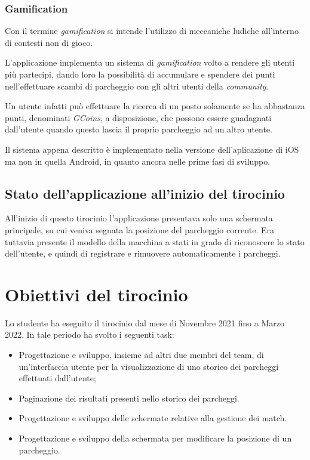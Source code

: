 \hypertarget{gamification}{%
\subsubsection{Gamification}\label{gamification}}

Con il termine \emph{gamification} si intende l'utilizzo di meccaniche ludiche all'interno di contesti non di gioco.

L'applicazione implementa un sistema di \emph{gamification} volto a rendere gli utenti più partecipi, dando loro la possibilità di accumulare e spendere dei punti nell'effettuare scambi di parcheggio con gli altri utenti della \emph{community}.

Un utente infatti può effettuare la ricerca di un posto solamente se ha abbastanza punti, denominati \emph{GCoins}, a disposizione, che possono essere guadagnati dall'utente quando questo lascia il proprio parcheggio ad un altro utente.

Il sistema appena descritto è implementato nella versione dell'aplicazione di iOS ma non in quella Android, in quanto ancora nelle prime fasi di sviluppo.

\hypertarget{stato-dellapplicazione-allinizio-del-tirocinio}{%
\subsection{Stato dell'applicazione all'inizio del tirocinio}\label{stato-dellapplicazione-allinizio-del-tirocinio}}

All'inizio di questo tirocinio l'applicazione presentava solo una schermata principale, su cui veniva segnata la posizione del parcheggio corrente. Era tuttavia presente il modello della macchina a stati in grado di riconoscere lo stato dell'utente, e quindi di registrare e rimuovere automaticamente i parcheggi.

\hypertarget{obiettivi-del-tirocinio}{%
\section{Obiettivi del tirocinio}\label{obiettivi-del-tirocinio}}

Lo studente ha eseguito il tirocinio dal mese di Novembre 2021 fino a Marzo 2022. In tale periodo ha svolto i seguenti task:

\begin{itemize}

\item Progettazione e sviluppo, insieme ad altri due membri del team, di un'interfaccia utente per la visualizzazione di uno storico dei parcheggi effettuati dall'utente;
\item Paginazione dei risultati presenti nello storico dei parcheggi.
\item Progettazione e sviluppo delle schermate relative alla gestione dei match.
\item Progettazione e sviluppo della schermata per modificare la posizione di un parcheggio.
\end{itemize}

